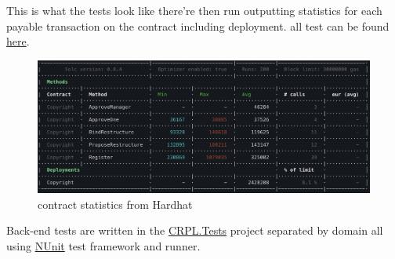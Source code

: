 This is what the tests look like there're then run outputting statistics for each payable transaction on the contract including deployment. all  test can be found \href{https://github.com/MrHarrisonBarker/CRPL/tree/main/CRPL.Contracts/test}{here}.

\begin{figure}[H]
\caption{contract statistics from Hardhat}
\centering
\includegraphics[width=\textwidth,height=0.4\textheight,keepaspectratio]{images/appendix/tests/hardhat-results}
\centering
\end{figure}

Back-end tests are written in the \href{https://github.com/MrHarrisonBarker/CRPL/tree/main/CRPL.Tests}{CRPL.Tests} project separated by domain all using \href{https://nunit.org/}{NUnit} test framework and runner.

